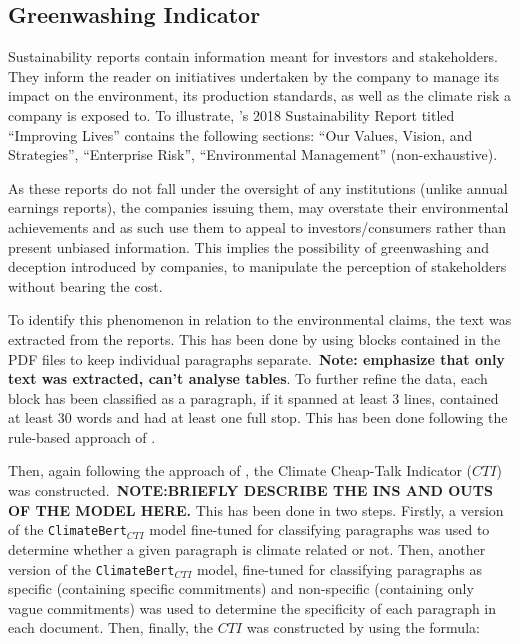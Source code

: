 \documentclass[12pt]{article}
\begin{document}
    
\subsection{Greenwashing Indicator}

Sustainability reports contain information meant for investors and stakeholders. They inform the reader on initiatives undertaken by the company to manage its impact on the environment, its production standards, as well as the climate risk a company is exposed to. To illustrate, \citeauthor{3m2018sustainability}'s 2018 Sustainability Report titled ``Improving Lives'' contains the following sections:  ``Our Values, Vision, and 
Strategies'', ``Enterprise Risk'', ``Environmental Management'' (non-exhaustive). 

As these reports do not fall under the oversight of any institutions (unlike annual earnings reports), the companies issuing them, may overstate their environmental achievements and as such use them to appeal to investors/consumers rather than present unbiased information. This implies the possibility of greenwashing and deception introduced by companies, to manipulate the perception of stakeholders without bearing the cost. 

To identify this phenomenon in relation to the environmental claims, the text was extracted from the reports. This has been done by using blocks contained in the PDF files to keep individual paragraphs separate.\ \textbf{Note: emphasize that only text was extracted, can't analyse tables}. To further refine the data, each block has been classified as a paragraph, if it spanned at least 3 lines, contained at least 30 words and had at least one full stop. This has been done following the rule-based approach of \parencite{bingler_how_2024}. 

Then, again following the approach of \citeauthor{bingler_how_2024}, the Climate Cheap-Talk Indicator ($CTI$) was constructed.\ \textbf{NOTE:\@ BRIEFLY DESCRIBE THE INS AND OUTS OF THE MODEL HERE.} This has been done in two steps. Firstly, a version of the \texttt{ClimateBert}$_{CTI}$ model fine-tuned for classifying paragraphs was used to determine whether a given paragraph is climate related or not. Then, another version of the \texttt{ClimateBert}$_{CTI}$ model, fine-tuned for classifying paragraphs as specific (containing specific commitments) and non-specific (containing only vague commitments) was used to determine the specificity of each paragraph in each document. Then, finally, the $CTI$ was constructed by using the formula:
\end{document}
